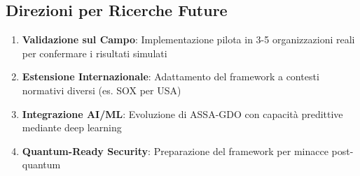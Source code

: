 \subsection{Direzioni per Ricerche Future}

\begin{enumerate}
\item \textbf{Validazione sul Campo}: Implementazione pilota in 3-5 organizzazioni reali per confermare i risultati simulati
\item \textbf{Estensione Internazionale}: Adattamento del framework a contesti normativi diversi (es. SOX per USA)
\item \textbf{Integrazione AI/ML}: Evoluzione di ASSA-GDO con capacità predittive mediante deep learning
\item \textbf{Quantum-Ready Security}: Preparazione del framework per minacce post-quantum
\end{enumerate}



\clearpage
\printbibliography[
    heading=subbibliography,
    title={Riferimenti Bibliografici del Capitolo 5},
]

